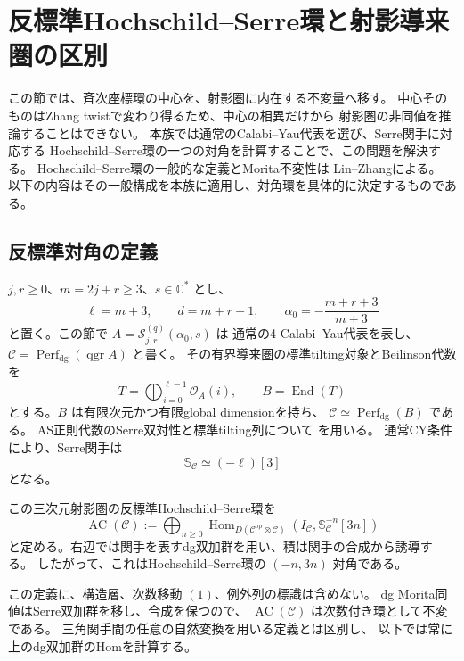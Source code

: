 \section{反標準Hochschild--Serre環と射影導来圏の区別}
\label{sec:anticanonical-serre-v35}

この節では、斉次座標環の中心を、射影圏に内在する不変量へ移す。
中心そのものはZhang twistで変わり得るため、中心の相異だけから
射影圏の非同値を推論することはできない。
本族では通常のCalabi--Yau代表を選び、Serre関手に対応する
Hochschild--Serre環の一つの対角を計算することで、この問題を解決する。
Hochschild--Serre環の一般的な定義とMorita不変性は
Lin--Zhang\cite[Definition~3.3 and Theorem~3.4]{LinZhangSerre2025}による。
以下の内容はその一般構成を本族に適用し、対角環を具体的に決定するものである。

\subsection{反標準対角の定義}

$j,r\ge0$、$m=2j+r\ge3$、$s\in\mathbb C^*$ とし、
\[
 \ell=m+3,\qquad d=m+r+1,\qquad
 \alpha_0=-\frac{m+r+3}{m+3}
\]
と置く。この節で $A=\mathcal S_{j,r}^{(q)}(\alpha_0,s)$ は
通常の4-Calabi--Yau代表を表し、
$\mathcal C=\operatorname{Perf}_{\mathrm{dg}}(\operatorname{qgr}A)$ と書く。
その有界導来圏の標準tilting対象とBeilinson代数を
\[
 T=\bigoplus_{i=0}^{\ell-1}\mathcal O_A(i),\qquad
 B=\operatorname{End}(T)
\]
とする。$B$ は有限次元かつ有限global dimensionを持ち、
$\mathcal C\simeq\operatorname{Perf}_{\mathrm{dg}}(B)$ である。
AS正則代数のSerre双対性と標準tilting列について
\cite[Proposition~4.4, Theorems~4.12 and~4.14]{MinamotoMori2011}を用いる。
通常CY条件により、Serre関手は
\[
 \mathbb S_{\mathcal C}\simeq(-\ell)[3]
\]
となる。

\begin{definition}
この三次元射影圏の反標準Hochschild--Serre環を
\[
 \operatorname{AC}(\mathcal C)
 :=\bigoplus_{n\ge0}
 \operatorname{Hom}_{D(\mathcal C^{\mathrm{op}}\otimes\mathcal C)}
 \left(I_{\mathcal C},\mathbb S_{\mathcal C}^{-n}[3n]\right)
\]
と定める。右辺では関手を表すdg双加群を用い、積は関手の合成から誘導する。
したがって、これはHochschild--Serre環の $(-n,3n)$ 対角である。
\end{definition}

この定義に、構造層、次数移動 $(1)$、例外列の標識は含めない。
dg Morita同値はSerre双加群を移し、合成を保つので、
$\operatorname{AC}(\mathcal C)$ は次数付き環として不変である。
三角関手間の任意の自然変換を用いる定義とは区別し、
以下では常に上のdg双加群のHomを計算する。

